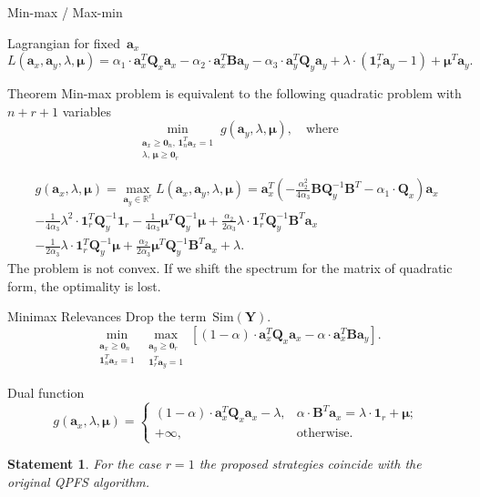 \documentclass[9pt]{beamer}
\newcommand{\ba}{\mathbf{a}}
\newcommand{\bY}{\mathbf{Y}}
\newcommand{\bB}{\mathbf{B}}
\newcommand{\bQ}{\mathbf{Q}}
\newcommand{\bbR}{\mathbb{R}}
\newcommand{\bmu}{\boldsymbol{\mu}}
\newcommand{\bOne}{\boldsymbol{1}}
\newcommand{\bZero}{\boldsymbol{0}}
\newtheorem{statement}{Statement}
\begin{document}
\begin{frame}{Min-max / Max-min}
	
	\begin{block}{Lagrangian for fixed~$\ba_x$}
	\vspace{-0.4cm}
	\[
	L(\ba_x, \ba_y, \lambda, \bmu) = \alpha_1 \cdot \ba_x^T \bQ_x \ba_x - \alpha_2 \cdot \ba_x^T \bB \ba_y - \alpha_3 \cdot \ba_y^T \bQ_y \ba_y + \lambda \cdot  (\bOne_r^T \ba_y - 1) + \bmu^T \ba_y.
	\]
	\end{block}
	\vspace{-0.2cm}
	\begin{block}{Theorem}
	Min-max problem is equivalent to the following quadratic problem with $n + r + 1$ variables
	\[
	\min_{\substack{\ba_x \geq \bZero_n, \, \bOne_n^T\ba_x=1 \\ \lambda, \, \bmu \geq \bZero_r}} g(\ba_y, \lambda, \bmu), \quad \text{where}
	\]
	\end{block}
	\vspace{-.8cm}
	\begin{multline*}
	g(\ba_x, \lambda, \bmu) 
	= \max_{\ba_y \in \bbR^r} L(\ba_x, \ba_y, \lambda, \bmu) = 
	\ba_x^T \left( - \frac{\alpha_2^2}{4\alpha_3} \bB \bQ_y^{-1} \bB^T - \alpha_1 \cdot \bQ_x\right) \ba_x \\ - \frac{1}{4 \alpha_3} \lambda^2 \cdot \bOne_r^T \bQ_y^{-1} \bOne_r - \frac{1}{4 \alpha_3} \bmu^T \bQ_y^{-1} \bmu + \frac{\alpha_2}{2 \alpha_3} \lambda \cdot \bOne_r^T \bQ_y^{-1} \bB^T \ba_x \\ - \frac{1}{2 \alpha_3} \lambda \cdot \bOne_r^T \bQ_y^{-1} \bmu + \frac{\alpha_2}{2 \alpha_3} \bmu^T \bQ_y^{-1} \bB^T \ba_x + \lambda. 
	\end{multline*} 
	The problem is not convex. If we shift the spectrum for the matrix of quadratic form, the optimality is lost. 
\end{frame}
\begin{frame}{Minimax Relevances}
	Drop the term~$\text{Sim}(\bY)$. 
	\[
		\min_{\substack{\ba_x \geq \bZero_n \\ \bOne_n^T\ba_x=1}} 	\max_{\substack{\ba_y \geq \bZero_r \\ \bOne_r^T\ba_y=1}} \left[ (1 - \alpha) \cdot \ba_x^T \bQ_x \ba_x - \alpha \cdot \ba_x^T \bB \ba_y \right].
	\]
	\begin{block}{Dual function}
	\[
	g(\ba_x, \lambda, \bmu) =
	\begin{cases}
	(1 - \alpha) \cdot \ba_x^T \bQ_x \ba_x - \lambda, & \alpha \cdot \bB^T \ba_x = \lambda \cdot \bOne_r + \bmu;  \\
	+ \infty, & \text{otherwise}.
	\end{cases}
	\]
	\end{block}
\begin{statement}
	For the case $r=1$ the proposed strategies coincide with the original QPFS algorithm.
\end{statement}
	
\end{frame}
\end{document}
